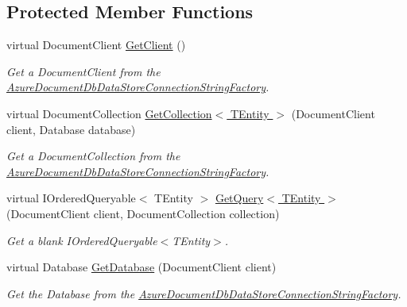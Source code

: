 \subsection*{Protected Member Functions}
\begin{DoxyCompactItemize}
\item 
virtual Document\+Client \hyperlink{classCqrs_1_1Azure_1_1DocumentDb_1_1Factories_1_1AzureDocumentDbDataStoreFactory_a4e7ff98b4f48fdc078a12f97c39d1bbb_a4e7ff98b4f48fdc078a12f97c39d1bbb}{Get\+Client} ()
\begin{DoxyCompactList}\small\item\em Get a Document\+Client from the \hyperlink{classCqrs_1_1Azure_1_1DocumentDb_1_1Factories_1_1AzureDocumentDbDataStoreConnectionStringFactory}{Azure\+Document\+Db\+Data\+Store\+Connection\+String\+Factory}. \end{DoxyCompactList}\item 
virtual Document\+Collection \hyperlink{classCqrs_1_1Azure_1_1DocumentDb_1_1Factories_1_1AzureDocumentDbDataStoreFactory_ad0a8f33b95b2ffba1d8bb86db389d327_ad0a8f33b95b2ffba1d8bb86db389d327}{Get\+Collection$<$ T\+Entity $>$} (Document\+Client client, Database database)
\begin{DoxyCompactList}\small\item\em Get a Document\+Collection from the \hyperlink{classCqrs_1_1Azure_1_1DocumentDb_1_1Factories_1_1AzureDocumentDbDataStoreConnectionStringFactory}{Azure\+Document\+Db\+Data\+Store\+Connection\+String\+Factory}. \end{DoxyCompactList}\item 
virtual I\+Ordered\+Queryable$<$ T\+Entity $>$ \hyperlink{classCqrs_1_1Azure_1_1DocumentDb_1_1Factories_1_1AzureDocumentDbDataStoreFactory_a8064c08a0b784283199bf8c0b94675e6_a8064c08a0b784283199bf8c0b94675e6}{Get\+Query$<$ T\+Entity $>$} (Document\+Client client, Document\+Collection collection)
\begin{DoxyCompactList}\small\item\em Get a blank I\+Ordered\+Queryable$<$\+T\+Entity$>$. \end{DoxyCompactList}\item 
virtual Database \hyperlink{classCqrs_1_1Azure_1_1DocumentDb_1_1Factories_1_1AzureDocumentDbDataStoreFactory_a0d010038f250f91446b9d94277c02c44_a0d010038f250f91446b9d94277c02c44}{Get\+Database} (Document\+Client client)
\begin{DoxyCompactList}\small\item\em Get the Database from the \hyperlink{classCqrs_1_1Azure_1_1DocumentDb_1_1Factories_1_1AzureDocumentDbDataStoreConnectionStringFactory}{Azure\+Document\+Db\+Data\+Store\+Connection\+String\+Factory}. \end{DoxyCompactList}\end{DoxyCompactItemize}
